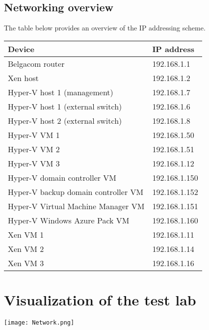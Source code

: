 \subsection{Networking overview}
The table below provides an overview of the IP addressing scheme.
\begin{table}[h!]
\begin{tabular}{|l|l|}
\hline
\textbf{Device}                 & \textbf{IP address} \\ \hline
Belgacom router                 & 192.168.1.1         \\ \hline
Xen host                      & 192.168.1.2         \\ \hline
Hyper-V host 1 (management)     & 192.168.1.7         \\ \hline
Hyper-V host 1 (external switch) & 192.168.1.6         \\ \hline
Hyper-V host 2 (external switch) & 192.168.1.8	\\ \hline
Hyper-V VM 1                    & 192.168.1.50        \\ \hline
Hyper-V VM 2                    & 192.168.1.51        \\ \hline
Hyper-V VM 3			& 192.168.1.12 \\ \hline
Hyper-V domain controller VM	&	192.168.1.150 \\ \hline
Hyper-V backup domain controller VM	&	192.168.1.152\\ \hline
Hyper-V Virtual Machine Manager VM	&	192.168.1.151 \\ \hline
Hyper-V Windows Azure Pack VM &	192.168.1.160\\ \hline
Xen VM 1                        & 192.168.1.11        \\ \hline
Xen VM 2                        & 192.168.1.14        \\ \hline
Xen VM 3                        & 192.168.1.16        \\ \hline
\end{tabular}
\end{table}

\section{Visualization of the test lab}

\noindent\begin{minipage}{\textwidth}
    \centering
    \texttt{[image: Network.png]}
\label{fig:network}
\end{minipage}
